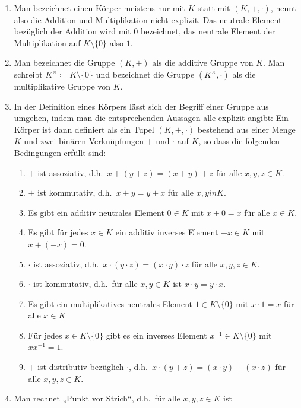 \begin{bem}
 \begin{enumerate}[leftmargin=*]
  \item
   Man bezeichnet einen Körper meistens nur mit $K$ statt mit $(K,+,\cdot)$, nennt also die Addition und Multiplikation nicht explizit. Das neutrale Element bezüglich der Addition wird mit $0$ bezeichnet, das neutrale Element der Multiplikation auf $K\setminus\{0\}$ also $1$.
  \item
   Man bezeichnet die Gruppe $(K,+)$ als die additive Gruppe von $K$. Man schreibt $K^\times \coloneqq K\setminus\{0\}$ und bezeichnet die Gruppe $(K^\times,\cdot)$ als die multiplikative Gruppe von $K$.
  \item
   In der Definition eines Körpers lässt sich der Begriff einer Gruppe aus umgehen, indem man die entsprechenden Aussagen alle explizit angibt: Ein Körper ist dann definiert als ein Tupel $(K,+,\cdot)$ bestehend aus einer Menge $K$ und zwei binären Verknüpfungen $+$ und $\cdot$ auf $K$, so dass die folgenden Bedingungen erfüllt sind:
   \begin{enumerate}[label=\roman*)]
    \item
     $+$ ist assoziativ, d.h.\ $x+(y+z) = (x+y)+z$ für alle $x,y,z \in K$.
    \item
     $+$ ist kommutativ, d.h.\ $x+y = y+x$ für alle $x,y in K$.
    \item
     Es gibt ein additiv neutrales Element $0 \in K$ mit $x + 0 = x$ für alle $x \in K$.
    \item
     Es gibt für jedes $x \in K$ ein additiv inverses Element $-x \in K$ mit $x+(-x) = 0$.
    \item
     $\cdot$ ist assoziativ, d.h.\ $x \cdot (y \cdot z) = (x \cdot y) \cdot z$ für alle $x,y,z \in K$.
    \item
     $\cdot$ ist kommutativ, d.h.\ für alle $x,y \in K$ ist $x \cdot y = y \cdot x$.
    \item
     Es gibt ein multiplikatives neutrales Element $1 \in K\setminus\{0\}$ mit $x \cdot 1 = x$ für alle $x \in K$
    \item
     Für jedes $x \in K\setminus\{0\}$ gibt es ein inverses Element $x^{-1} \in K\setminus\{0\}$ mit $x x^{-1} = 1$.
    \item
     $+$ ist distributiv bezüglich $\cdot$, d.h.\ $x \cdot (y+z) = (x \cdot y) + (x \cdot z)$ für alle $x,y,z \in K$.
   \end{enumerate}
  \item
   Man rechnet „Punkt vor Strich“, d.h.\ für alle $x,y,z \in K$ ist

\end{enumerate}
\end{bem}
